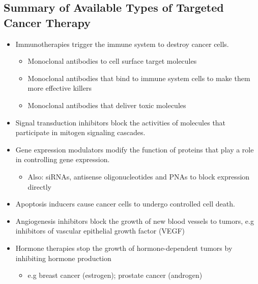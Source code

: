 \documentclass[10pt]{article}
\begin{document}
\subsection*{Summary of Available Types of Targeted Cancer Therapy}
\begin{itemize}
	\item Immunotherapies trigger the immune system to destroy cancer cells.
	\begin{itemize}
        \item Monoclonal antibodies to cell surface target molecules
        \item Monoclonal antibodies that bind to immune system cells to make them more effective killers
        \item Monoclonal antibodies that deliver toxic molecules
    \end{itemize}
    \item Signal transduction inhibitors block the activities of molecules that participate in mitogen signaling cascades.
    \item Gene expression modulators modify the function of proteins that play a role in controlling gene expression.
    \begin{itemize}
        \item Also: siRNAs, antisense oligonucleotides and PNAs to block expression directly
    \end{itemize}
    \item Apoptosis inducers cause cancer cells to undergo controlled cell death.
    \item Angiogenesis inhibitors block the growth of new blood vessels to tumors, e.g inhibitors of vascular epithelial growth factor (VEGF)
    \item Hormone therapies stop the growth of hormone-dependent tumors by inhibiting hormone production
    \begin{itemize}
        \item e.g breast cancer (estrogen); prostate cancer (androgen)
    \end{itemize}
\end{itemize}
\end{document}
